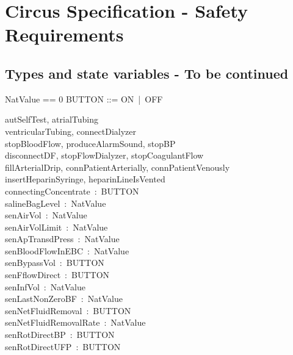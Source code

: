 \section{Circus Specification - Safety Requirements}
\subsection{Types and state variables - To be continued}

\begin{zed}
NatValue == 0 
\also BUTTON ::= ON~|~OFF
\end{zed}

\begin{circus}
  \circchannel autSelfTest, atrialTubing\\
  \circchannel ventricularTubing, connectDialyzer\\
  \circchannel stopBloodFlow, produceAlarmSound, stopBP\\
  \circchannel disconnectDF, stopFlowDialyzer, stopCoagulantFlow\\
  \circchannel fillArterialDrip, connPatientArterially, connPatientVenously\\
  \circchannel insertHeparinSyringe, heparinLineIsVented\\
  \circchannel connectingConcentrate~:~BUTTON\\
  \circchannel salineBagLevel~:~NatValue\\
  \circchannel senAirVol~:~NatValue\\
  \circchannel senAirVolLimit~:~NatValue\\
  \circchannel senApTransdPress~:~NatValue\\
  \circchannel senBloodFlowInEBC~:~NatValue\\
  \circchannel senBypassVol~:~BUTTON\\
  \circchannel senFflowDirect~:~BUTTON\\
  \circchannel senInfVol~:~NatValue\\
  \circchannel senLastNonZeroBF~:~NatValue\\
  \circchannel senNetFluidRemoval~:~BUTTON\\
  \circchannel senNetFluidRemovalRate~:~NatValue\\
  \circchannel senRotDirectBP~:~BUTTON~\\
  \circchannel senRotDirectUFP~:~BUTTON~\\

\end{circus}
